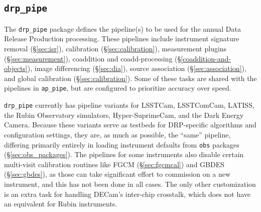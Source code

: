 \subsection{\texttt{drp\_pipe}}
\label{sec:drp_pipe}

The \texttt{drp\_pipe} package defines the pipeline(s) to be used for the annual Data Release Production processing.
These pipelines include instrument signature removal (\S\ref{sec:isr}), calibration (\S\ref{sec:calibration}), measurement plugins (\S\ref{sec:measurement}), coaddition and coadd-processing (\S\ref{coaddition-and-objects}), image differencing (\S\ref{sec:dia}), source association (\S\ref{sec:association}), and global calibration (\S\ref{sec:calibration}).
Some of these tasks are shared with the pipelines in \texttt{ap\_pipe}, but are configured to prioritize accuracy over speed.

\texttt{drp\_pipe} currently has pipeline variants for LSSTCam, LSSTComCam, LATISS, the Rubin Observatory simulators, Hyper-SuprimeCam, and the Dark Energy Camera.
Because these variants serve as testbeds for DRP-specific algorithms and configuration settings, they are, as much as possible, the ``same'' pipeline, differing primarily entirely in loading instrument defaults from \texttt{obs} packages (\S\ref{sec:obs_packages}).
The pipelines for some instruments also disable certain multi-visit calibration routines like FGCM (\S\ref{sec:fgcmcal}) and GBDES (\S\ref{sec:gbdes}), as those can take significant effort to commission on a new instrument, and this has not been done in all cases.
The only other customization is an extra task for handling DECam's inter-chip crosstalk, which does not have an equivalent for Rubin instruments.
